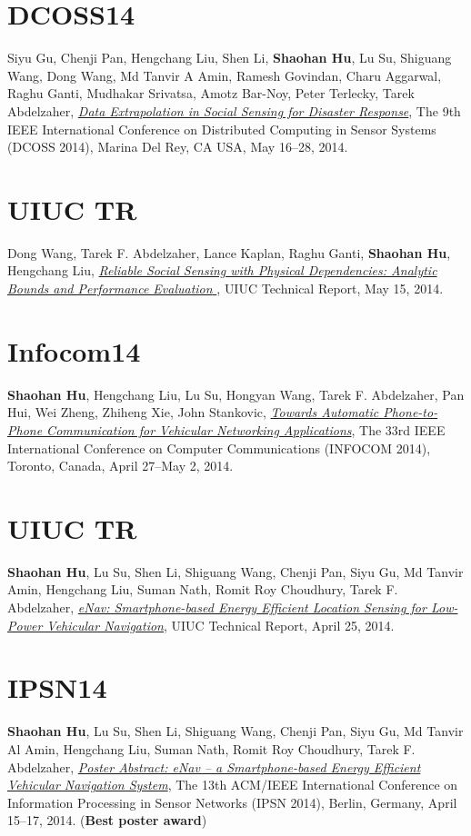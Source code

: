 \section{\sc DCOSS14}\hypertarget{gu2014dcoss}{}
Siyu Gu, Chenji Pan, Hengchang Liu, Shen Li, \textbf{Shaohan Hu}, Lu Su, Shiguang Wang, Dong Wang, Md Tanvir A Amin, Ramesh Govindan, Charu Aggarwal, Raghu Ganti, Mudhakar Srivatsa, Amotz Bar-Noy, Peter Terlecky, Tarek Abdelzaher, \href{http://ieeexplore.ieee.org/xpl/articleDetails.jsp?reload=true&tp=&arnumber=6846153}{\emph{Data Extrapolation in Social Sensing for Disaster Response}}, \textsf{The 9th IEEE International Conference on Distributed Computing in Sensor Systems (DCOSS 2014)}, Marina Del Rey, CA USA, May 16--28, 2014.

\section{\sc UIUC TR}\hypertarget{wang2014uiuc}{}
Dong Wang, Tarek F. Abdelzaher, Lance Kaplan, Raghu Ganti, \textbf{Shaohan Hu}, Hengchang Liu, \href{https://www.ideals.illinois.edu/handle/2142/49113}{\emph{Reliable Social Sensing with Physical Dependencies: Analytic Bounds and Performance Evaluation
}}, \textsf{UIUC Technical Report}, May 15, 2014.

\section{\sc Infocom14}\hypertarget{hu2014infocom}{}
\textbf{Shaohan Hu}, Hengchang Liu, Lu Su, Hongyan Wang, Tarek F.
Abdelzaher, Pan Hui, Wei Zheng, Zhiheng Xie, John Stankovic,
\href{}{\emph{Towards Automatic Phone-to-Phone Communication for Vehicular
  Networking Applications}}, \textsf{The 33rd IEEE International Conference on Computer Communications (INFOCOM 2014)}, Toronto, Canada, April 27--May 2, 2014.

\section{\sc UIUC TR}\hypertarget{hu2014uiuc1}{}
\textbf{Shaohan Hu}, Lu Su, Shen Li, Shiguang Wang, Chenji Pan, Siyu Gu, Md Tanvir Amin,
Hengchang Liu, Suman Nath, Romit Roy Choudhury, Tarek F. Abdelzaher, \href{https://www.ideals.illinois.edu/handle/2142/48917}{\emph{eNav:
  Smartphone-based Energy Efficient Location Sensing for Low-Power
  Vehicular Navigation}}, \textsf{UIUC Technical Report}, April 25, 2014.

\section{\sc IPSN14}\hypertarget{hu2014ipsn}{}
\textbf{Shaohan Hu}, Lu Su, Shen Li, Shiguang Wang, Chenji Pan, Siyu Gu, Md Tanvir Al Amin, Hengchang Liu, Suman Nath, Romit Roy Choudhury, Tarek F.
Abdelzaher, \href{http://dl.acm.org/citation.cfm?id=2602374}{\emph{Poster Abstract: eNav -- a Smartphone-based Energy Efficient Vehicular Navigation System}}, \textsf{The 13th
  ACM/IEEE International Conference on Information Processing in
  Sensor Networks (IPSN 2014)}, Berlin, Germany, April 15--17, 2014. (\textbf{Best poster award})

